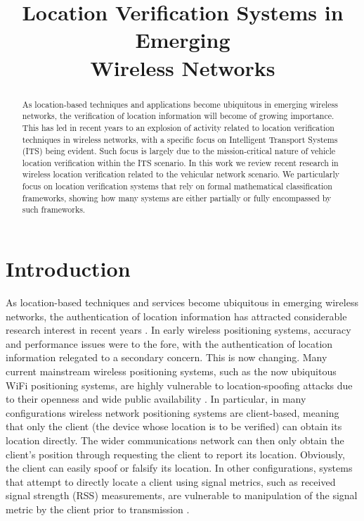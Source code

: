 \documentclass[journal]{IEEEtran}
\title{Location Verification Systems in Emerging \\Wireless Networks}
\author{
\IEEEauthorblockN{Shihao Yan,
                  Robert Malaney\\
\IEEEauthorblockA{
School of Electrical Engineering and Telecommunications, UNSW, Sydney, Australia}}
}
\begin{document}
\maketitle

\begin{abstract}
As location-based techniques and applications become ubiquitous in emerging wireless networks,  the verification of location information will become of growing importance. This has led in recent years to an explosion of activity related to location verification techniques in wireless networks, with a specific focus on Intelligent Transport Systems (ITS) being evident. Such focus is largely due to the mission-critical nature of vehicle location verification  within the ITS scenario. In this work we review recent research in wireless location verification related to  the vehicular network scenario. We particularly focus on location verification systems
that rely on formal mathematical classification frameworks, showing how many systems are either  partially or fully encompassed by such frameworks.
\end{abstract}

\section{Introduction}\label{introduction}

 As location-based techniques and services become ubiquitous in emerging wireless networks, the authentication of location information  has attracted considerable research interest in recent years \cite{malaney2004location,raya2005the,faria2006detection,papad2006securing,raya2007securing,sheng2008detecting,zhang2008evaluation,papad2008secure,bao2008location,bauer2009the,zekavat2011handbook,yang2013detection}. In early wireless positioning systems, accuracy and performance issues were to the fore, with the authentication of location information relegated to a secondary concern. This is now changing. Many current mainstream wireless positioning systems, such as the now ubiquitous WiFi positioning systems,  are highly vulnerable to location-spoofing attacks due to their openness and wide public availability \cite{ledvina2004bitwise,tippen2008iphone}. In particular, in many configurations wireless network positioning systems are  client-based\cite{hofmann1997global,bulusu2000gps}, meaning that only the client (the device whose location is to be verified) can obtain its location directly. The wider communications network can then only obtain the client's position through requesting the client to report its location. Obviously, the client can easily spoof  or falsify its  location. In other configurations, systems that attempt to directly locate a client using signal metrics, such as  received signal strength (RSS) measurements, are vulnerable to manipulation of the signal metric by the client prior to transmission \cite{li2005robust,capkun2006secure,liu2008attack,mahfouz2013distance}.
\end{document}
